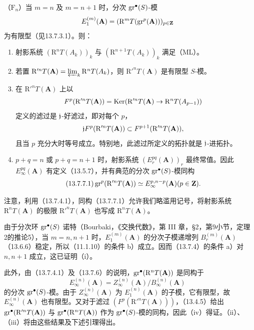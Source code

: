 \noindent（$\mathrm F_n$）当 $m=n$ 及 $m=n+1$ 时，分次 $\operatorname{gr}^\bullet(S)$-模
\[
E_1^{(m)}(\mathbf A)
=(\mathrm R^mT(\operatorname{gr}^p(\mathbf A)))_{p\in\mathbf Z}
\]
为有限型（见13.7.3.1）。则：
\begin{enumerate}[label=(\roman*)]
\item 射影系统 $(\mathrm R^nT(A_k))_k$ 与 $(\mathrm R^{n+1}T(A_k))_k$ 满足（ML）。
\item 若置 $\mathrm R'^nT(\mathbf A)=\varprojlim_k\mathrm R^nT(A_k)$，则 $\mathrm R'^nT(\mathbf A)$ 是有限型 $S$-模。
\item 在 $\mathrm R'^nT(\mathbf A)$ 上以
\[
F^p(\mathrm R'^nT(\mathbf A))
=\operatorname{Ker}(\mathrm R'^nT(\mathbf A)\to\mathrm R^nT(A_{p-1}))
\]
定义的滤过是 $\mathfrak j$-好滤过，即对每个 $p$，
\[
\mathfrak j F^p(\mathrm R'^nT(\mathbf A))\subset F^{p+1}(\mathrm R'^nT(\mathbf A)),
\]
且当 $p$ 充分大时等号成立。特别地，此滤过所定义的拓扑就是 $\mathfrak j$-进拓扑。
\item $p+q=n$ 或 $p+q=n+1$ 时，射影系统 $(E_r^{pq}(\mathbf A))_r$ 最终常值。因此 $E_\infty^{pq}(\mathbf A)$ 有定义（13.5.7），并有典范的分次 $\operatorname{gr}^\bullet(S)$-模同构
\begin{equation}\tag{13.7.7.1}
\gr^p(\mathrm R'^nT(\mathbf A))\simeq E_\infty^{p,n-p}(\mathbf A)\qquad(p\in\Z).
\end{equation}
\end{enumerate}
注意，利用（13.7.4.1），同构（13.7.7.1）允许我们略滥用记号，将射影系统 $\mathrm R^nT(\mathbf A)$ 的极限 $\mathrm R'^nT(\mathbf A)$ 也写成 $\mathrm R^nT(\mathbf A)$。

\eproof
由于分次环 $\operatorname{gr}^\bullet(S)$ 诺特（Bourbaki，《交换代数》，第 III 章，§2，第9小节，定理2的推论5），当 $m=n,n+1$ 时，$E_1^{(m)}(\mathbf A)$ 的分次子模递增列 $B_r^{(m)}(\mathbf A)$（13.6.6）稳定，所以（11.1.10）的条件 b）成立。因而（13.7.4）的条件 a）对 $n,n+1$ 成立，这已证明（i）。

此外，由（13.7.4.1）及（13.7.6）的说明，$\operatorname{gr}^\bullet(\mathrm R^nT(\mathbf A))$ 是同构于
\[
E_\infty^{(n)}(\mathbf A)=Z_\infty^{(n)}(\mathbf A)/B_\infty^{(n)}(\mathbf A)
\]
的分次 $\operatorname{gr}^\bullet(S)$-模。由于 $Z_\infty^{(n)}(\mathbf A)$ 为 $E_1^{(n)}(\mathbf A)$ 的子模，它有限型，故 $E_\infty^{(n)}(\mathbf A)$ 也有限型。又对于滤过 $(F^p(\mathrm R'^nT(\mathbf A)))$，（13.4.5）给出 $\operatorname{gr}^\bullet(\mathrm R'^nT(\mathbf A))$ 与 $\operatorname{gr}^\bullet(\mathrm R^nT(\mathbf A))$ 作为 $\operatorname{gr}^\bullet(S)$-模的同构，因此（iv）得证。（ii）、（iii）将由这些结果及下述引理得出。

